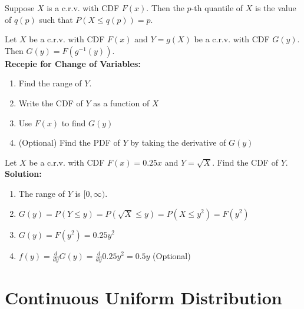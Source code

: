 \documentclass{report}
\begin{document}
 {
Suppose $X$ is a c.r.v. with CDF $F(x)$. Then the $p$-th quantile of $X$ is the value of $q(p)$ such that $P(X \leq q(p)) = p$.}
	

 {
Let $X$ be a c.r.v. with CDF $F(x)$ and $Y = g(X)$ be a c.r.v. with CDF $G(y)$. Then $G(y) = F(g^{-1}(y))$.
\\[1em] \textbf{Recepie for Change of Variables:}
	\begin{enumerate}
		\item Find the range of $Y$.
		\item Write the CDF of $Y$ as a function of $X$
		\item Use $F(x)$ to find $G(y)$
		\item (Optional) Find the PDF of $Y$ by taking the derivative of $G(y)$
	\end{enumerate}
}

 {
Let $X$ be a c.r.v. with CDF $F(x) = 0.25x$ and $Y = \sqrt{X}$. Find the CDF of $Y$.
\\[1em]
\textbf{Solution:}
	\begin{enumerate}
		\item The range of $Y$ is $[0, \infty)$.
		\item $G(y) = P(Y \leq y) = P(\sqrt{X} \leq y) = P(X \leq y^2) = F(y^2)$
		\item $G(y) = F(y^2) = 0.25y^2$
		\item $f(y) = \frac{d}{dy} G(y) = \frac{d}{dy} 0.25y^2 = 0.5y$ (Optional)
	\end{enumerate}
}



\section{Continuous Uniform Distribution}
\end{document}
